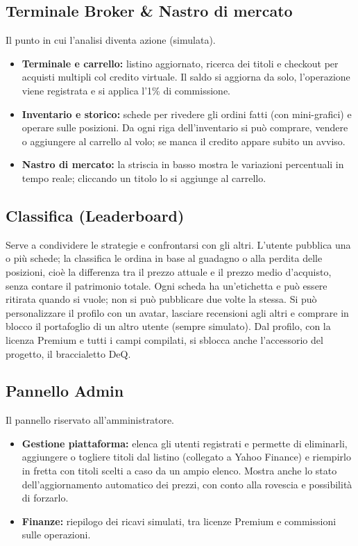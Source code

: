 \subsection{Terminale Broker \& Nastro di mercato}
Il punto in cui l'analisi diventa azione (simulata).
\begin{itemize}[itemsep=-2pt]
    \item \textbf{Terminale e carrello:} listino aggiornato, ricerca dei titoli e checkout per acquisti multipli col credito virtuale. Il saldo si aggiorna da solo, l'operazione viene registrata e si applica l'1\% di commissione.
    \item \textbf{Inventario e storico:} schede per rivedere gli ordini fatti (con mini-grafici) e operare sulle posizioni. Da ogni riga dell'inventario si può comprare, vendere o aggiungere al carrello al volo; se manca il credito appare subito un avviso.
    \item \textbf{Nastro di mercato:} la striscia in basso mostra le variazioni percentuali in tempo reale; cliccando un titolo lo si aggiunge al carrello.
\end{itemize}

\subsection{Classifica (Leaderboard)}
Serve a condividere le strategie e confrontarsi con gli altri. L'utente pubblica una o più schede; la classifica le ordina in base al guadagno o alla perdita delle posizioni, cioè la differenza tra il prezzo attuale e il prezzo medio d'acquisto, senza contare il patrimonio totale. Ogni scheda ha un'etichetta e può essere ritirata quando si vuole; non si può pubblicare due volte la stessa. Si può personalizzare il profilo con un avatar, lasciare recensioni agli altri e comprare in blocco il portafoglio di un altro utente (sempre simulato). Dal profilo, con la licenza Premium e tutti i campi compilati, si sblocca anche l'accessorio del progetto, il braccialetto DeQ.

\subsection{Pannello Admin}
Il pannello riservato all'amministratore.
\begin{itemize}[itemsep=-2pt]
    \item \textbf{Gestione piattaforma:} elenca gli utenti registrati e permette di eliminarli, aggiungere o togliere titoli dal listino (collegato a Yahoo Finance) e riempirlo in fretta con titoli scelti a caso da un ampio elenco. Mostra anche lo stato dell'aggiornamento automatico dei prezzi, con conto alla rovescia e possibilità di forzarlo.
    \item \textbf{Finanze:} riepilogo dei ricavi simulati, tra licenze Premium e commissioni sulle operazioni.
\end{itemize}

